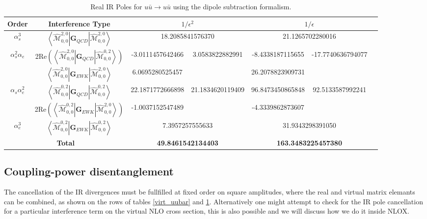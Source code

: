 \documentclass[a4paper]{article}
\def \MBra#1#2#3#4{\left<\hat{\mathcal{M}}_{#1,#2}^{#3,#4}\right|}
\def \MKet#1#2#3#4{\left|\hat{\mathcal{M}}_{#1,#2}^{#3,#4}\right>}
\begin{document}
\begin{table}[ht!]
 \begin{tabular}{c|c|c|c|c|c|c}
 Order& Interference Type
 & \multicolumn{2}{c}{$1/\epsilon^{2}$} 
 & \multicolumn{2}{|c}{$1/\epsilon$}\\\hline
 $\alpha_s^3$                           
 & $\MBra{0}{0}{2}{0}\textbf{G}_{QCD}\MKet{0}{0}{2}{0}$
 & \multicolumn{2}{|c|}{18.2085841576370} 
 & \multicolumn{2}{|c|}{21.1265702280016} \\\hline
 \multirow{2}{*}{$\alpha_s^2\alpha_e$}                                                        
 & 2Re$\left(\MBra{0}{0}{2}{0}\textbf{G}_{QCD}\MKet{0}{0}{0}{2}\right)$
 & -3.0111457642466 & \multirow{2}{*}{3.0583822882991} 
 & -8.4338187115655 & \multirow{2}{*}{-17.7740636794077} \\
 & $\MBra{0}{0}{2}{0}\textbf{G}_{EWK}\MKet{0}{0}{2}{0}$
 & 6.0695280525457 && 26.2078823909731 &\\\hline
 \multirow{2}{*}{$\alpha_s\alpha_e^2$}                                                  
 & $\MBra{0}{0}{0}{2}\textbf{G}_{QCD}\MKet{0}{0}{0}{2}$
 & 22.1871772666898 & \multirow{2}{*}{21.1834620119409} 
 & 96.8473450865848 & \multirow{2}{*}{92.5133587992241} \\
 & 2Re$\left(\MBra{0}{0}{0}{2}\textbf{G}_{EWK}\MKet{0}{0}{2}{0}\right)$ 
 & -1.0037152547489 && -4.3339862873607 &\\\hline
 $\alpha_e^3$                                                                             
 & $\MBra{0}{0}{0}{2}\textbf{G}_{EWK}\MKet{0}{0}{0}{2}$
 & \multicolumn{2}{|c|}{7.3957257555633} 
 & \multicolumn{2}{|c}{31.9343298391050} \\\hline
   \multicolumn{2}{c|}{\textbf{Total}}     
 & \multicolumn{2}{|c|}{\textbf{49.8461542134403}} 
 & \multicolumn{2}{|c}{\textbf{163.3483225457380}}\\\hline
 \end{tabular}
 \caption{Real IR Poles for $u\bar u\longrightarrow u\bar u$ using the dipole subtraction formalism.}
 \label{real_uubar}
\end{table}


\subsection{Coupling-power disentanglement}
The cancellation of the IR divergences must be fullfilled at fixed order on square amplitudes,
where the real and virtual matrix elemants can be combined, as shown on the rows of tables \ref{virt_uubar}
and \ref{real_uubar}. Alternatively one might attempt to check for the IR pole cancellation 
for a particular interference term on the virtual NLO cross section, this is also possible and 
we will discuss how we do it inside NLOX.
\end{document}
